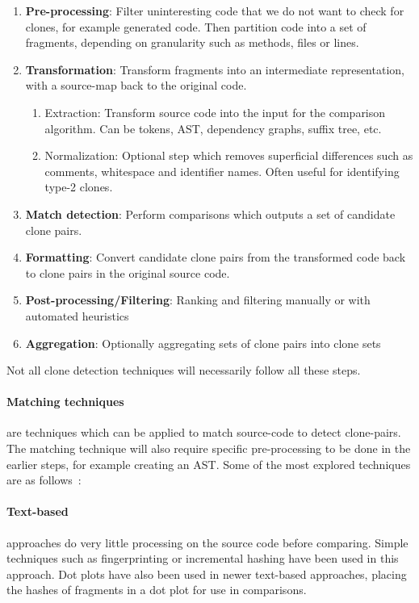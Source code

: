 \begin{enumerate}
	\item \textbf{Pre-processing}: Filter uninteresting code that we do not want to
	      check for clones, for example generated code. Then partition code into a set of
	      fragments, depending on granularity such as methods, files or lines.
	\item \textbf{Transformation}: Transform fragments into an intermediate
	      representation, with a source-map back to the original code.
	      \begin{enumerate}
		      \item Extraction: Transform source code into the input for the comparison
		            algorithm. Can be tokens, AST, dependency graphs, suffix tree, etc.
		      \item Normalization: Optional step which removes superficial differences such as
		            comments, whitespace and identifier names. Often useful for identifying type-2
		            clones.
	      \end{enumerate}
	\item \textbf{Match detection}: Perform comparisons which outputs a set of
	      candidate clone pairs.
	\item \textbf{Formatting}: Convert candidate clone pairs from the transformed
	      code back to clone pairs in the original source code.
	\item \textbf{Post-processing/Filtering}: Ranking and filtering manually or with
	      automated heuristics
	\item \textbf{Aggregation}: Optionally aggregating sets of clone pairs into clone sets
\end{enumerate}

Not all clone detection techniques will necessarily follow all these steps.

\paragraph{Matching techniques} are techniques which can be applied to match source-code to
detect clone-pairs. The matching technique will also require specific pre-processing to be
done in the earlier steps, for example creating an AST. Some of the most explored
techniques are as follows~\cite{ComparisonAndEvaluationOfTechniques}:

\paragraph{Text-based} approaches do very little processing on the source code before
comparing. Simple techniques such as fingerprinting or incremental hashing have been used
in this approach. Dot plots have also been used in newer text-based approaches, placing
the hashes of fragments in a dot plot for use in comparisons.

